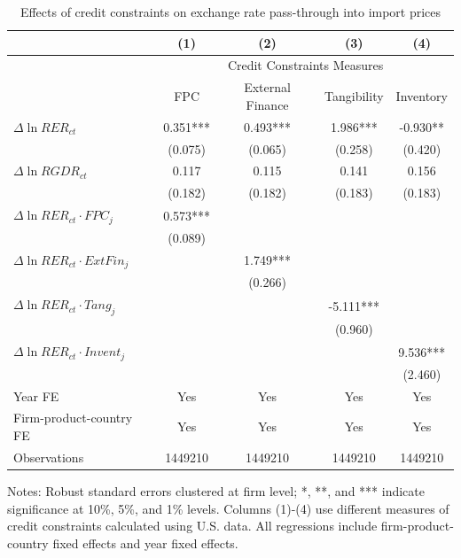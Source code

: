 \begin{table}[htb]
	\centering
	\caption{Effects of credit constraints on exchange rate pass-through into import prices}
	\begin{threeparttable}	
		\begin{tabular}{lcccc}
			\toprule
			& (1)   & (2)   & (3)   & (4) \\
			\midrule
			 & \multicolumn{4}{c}{Credit Constraints Measures} \\
			& FPC   & External Finance & Tangibility & Inventory \\
			\midrule
			$\Delta \ln RER_{ct}$ & 0.351*** & 0.493*** & 1.986*** & -0.930** \\
			& (0.075) & (0.065) & (0.258) & (0.420) \\
			$\Delta \ln RGDR_{ct}$ & 0.117 & 0.115 & 0.141 & 0.156 \\
			& (0.182) & (0.182) & (0.183) & (0.183) \\
			$\Delta \ln RER_{ct} \cdot FPC_{j}$ & 0.573*** &       &       &  \\
			& (0.089) &       &       &  \\
			$\Delta \ln RER_{ct} \cdot ExtFin_{j}$ &    & 1.749*** &       &  \\
			&   & (0.266) &       &  \\
			$\Delta \ln RER_{ct} \cdot Tang_{j}$ &   &       & -5.111*** &  \\
			&   &       & (0.960) &  \\
			$\Delta \ln RER_{ct} \cdot Invent_{j}$ &    &       &       & 9.536*** \\
			&   &       &       & (2.460) \\
                \midrule
			Year FE  & Yes   & Yes   & Yes   & Yes \\
			Firm-product-country FE & Yes   & Yes   & Yes   & Yes \\
			Observations & 1449210 & 1449210 & 1449210 & 1449210 \\
			\bottomrule
		\end{tabular}
		\begin{tablenotes}
			\footnotesize
			\item Notes: Robust standard errors clustered at firm level;  *, **, and *** indicate significance at 10\%, 5\%, and 1\% levels. Columns (1)-(4) use different measures of credit constraints calculated using U.S. data. All regressions include firm-product-country fixed effects and year fixed effects.
		\end{tablenotes}
	\end{threeparttable}
	\label{tab.credit}
\end{table}

